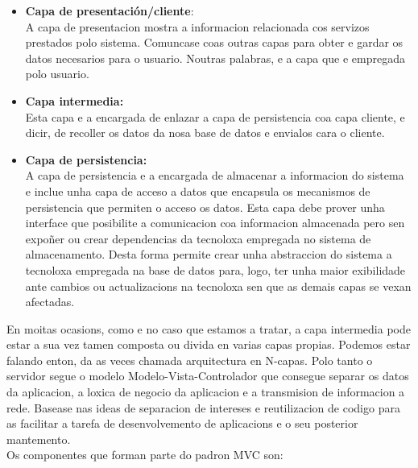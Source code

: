 \begin{itemize}
\item \textbf{Capa de presentación/cliente}:\\

A capa de presentacion mostra a informacion relacionada cos servizos prestados polo
sistema. Comuncase coas outras capas para obter e gardar os datos necesarios para
o usuario. Noutras palabras, e a capa que e empregada polo usuario.
\item \textbf{Capa intermedia:}\\


Esta capa e a encargada de enlazar a capa de persistencia coa capa cliente, e dicir,
de recoller os datos da nosa base de datos e envialos cara o cliente.
\item \textbf{Capa de persistencia:}\\


A capa de persistencia e a encargada de almacenar a informacion do sistema e
inclue unha capa de acceso a datos que encapsula os mecanismos de persistencia que
permiten o acceso os datos. Esta capa debe prover unha interface que posibilite a
comunicacion coa informacion almacenada pero sen expoñer ou crear dependencias
da tecnoloxa empregada no sistema de almacenamento. Desta forma permite crear
unha abstraccion do sistema a tecnoloxa empregada na base de datos para, logo,
ter unha maior 
exibilidade ante cambios ou actualizacions na tecnoloxa sen que as
demais capas se vexan afectadas.


\end{itemize}
En moitas ocasions, como e no caso que estamos a tratar, a capa intermedia pode estar
a sua vez tamen composta ou divida en varias capas propias. Podemos estar falando enton,
da as veces chamada arquitectura en N-capas.
Polo tanto o servidor segue o modelo Modelo-Vista-Controlador que consegue separar os
datos da aplicacion, a loxica de negocio da aplicacion e a transmision de informacion a rede.
Basease nas ideas de separacion de intereses e reutilizacion de codigo para as facilitar a
tarefa de desenvolvemento de aplicacions e o seu posterior mantemento.\\


Os componentes que forman parte do padron MVC son:

